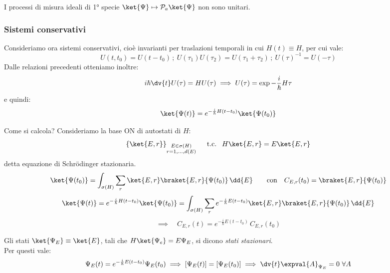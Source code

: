 \begin{attention}
    I processi di misura ideali di 1° specie \(\ket{\Psi}\mapsto \mathcal{P}_a\ket{\Psi}\) non sono unitari.
\end{attention}


\subsubsection{Sistemi conservativi}

Consideriamo ora sistemi conservativi, cioè invarianti per traslazioni temporali in cui \(H(t)\equiv H\), per cui vale:
\[
    U(t,t_0)= U(t-t_0)\,;\ U(\tau_1)U(\tau_2)= U(\tau_1+\tau_2)\,;\ U(\tau)^{-1}= U(-\tau)
\]
Dalle relazioni precedenti otteniamo inoltre:
\begin{equation}
    i\hbar \dv{t} U(\tau) = HU(\tau) \implies U(\tau)= \exp{-\frac{i}{\hbar}H \tau}
\end{equation}
e quindi:
\begin{equation}
    \ket{\Psi(t)}= e^{-\frac{i}{\hbar}H (t-t_0)}\ket{\Psi(t_0)}
\end{equation}

Come si calcola? Consideriamo la base ON di autostati di \(H\):
\[
    \left\{ \ket{E,r} \right\}_{\substack{E \in \sigma(H)\\ r = 1,\dots, d(E)}}  \quad \text{ t.c. }  \ H\ket{E,r}= E\ket{E,r}
\]
detta equazione di Schrödinger stazionaria.
\[
\ket{\Psi(t_0)} = \int_{\sigma(H)} \sum_r \ket{E,r}\braket{E,r}{\Psi(t_0)}\,\dd{E}
\qquad
\text{con} \quad C_{E,r}(t_0) = \braket{E,r}{\Psi(t_0)}
\]
\begin{equation}
    \ket{\Psi(t)} = e^{-\frac{i}{\hbar}H(t-t_0)}\ket{\Psi(t_0)}
    = \int_{\sigma(H)} \sum_r e^{-\frac{i}{\hbar}E(t-t_0)}\ket{E,r}\braket{E,r}{\Psi(t_0)}\,\dd{E}
\end{equation}
\begin{equation}
    \implies \quad C_{E,r}(t) = e^{-\frac{i}{\hbar}E(t-t_0)}\,C_{E,r}(t_0)
\end{equation}

\begin{definition}
    Gli stati \(\ket{\Psi_E}\equiv\ket{E}\), tali che \(H\ket{\Psi_e}= E\Psi_E\), si dicono \textit{stati stazionari}.\\
    Per questi vale:
    \[
        \Psi_E(t) = e^{-\frac{i}{\hbar}E(t-t_0)}\Psi_E(t_0) \implies \left[ \Psi_E(t) \right] = \left[ \Psi_E(t_0) \right] 
        \implies \dv{t}\expval{A}_{\Psi_E}= 0 \ \forall A  
    \]
\end{definition}

